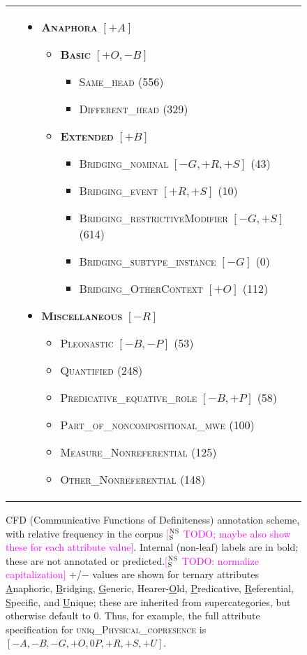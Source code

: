 \documentclass[11pt,letterpaper]{article}
\newcommand{\ensuretext}[1]{#1}
\newcommand{\nssmarker}{\ensuretext{\textcolor{magenta}{\ensuremath{^{\textsc{NS}}_{\textsc{S}}}}}}
\newcommand{\arkcomment}[3]{\ensuretext{\textcolor{#3}{[#1 #2]}}}
\newcommand{\nss}[1]{\arkcomment{\nssmarker}{#1}{magenta}}
\newcommand{\ilbl}[1]{\mbox{\textbf{\textsc{#1}}}} %
\newcommand{\llbl}[1]{\mbox{\textsc{#1}}} %
\newcommand{\costversion}[1]{}
\begin{document}
\begin{figure*}[t]
\begin{tabular}{p{}p{}}
\begin{itemize}
\end{itemize} &
\begin{itemize}
\item    \ilbl{Anaphora} $[+A]$
  \begin{itemize}
  \item      \ilbl{Basic} $[+O,-B]$
    \begin{itemize}
    \item        \llbl{Same\_head} {\tiny(556)}
    \item        \llbl{Different\_head} {\tiny(329)}
    \end{itemize}
  \item  \ilbl{Extended} $[+B]$
    \begin{itemize}
    \item        \llbl{Bridging\_nominal} $[-G,+R,+S]$ {\tiny(43)}
    \item        \llbl{Bridging\_event} $[+R,+S]$ {\tiny(10)}
    \item        \llbl{Bridging\_restrictiveModifier} $[-G,+S]$ {\tiny(614)}
    \item        \llbl{Bridging\_subtype\_instance} $[-G]$ {\tiny(0)}
    \item        \llbl{Bridging\_OtherContext} $[+O]$ {\tiny(112)}
    \end{itemize}
  \end{itemize}
\item \ilbl{Miscellaneous} $[-R]$
  \begin{itemize}
	\item \llbl{Pleonastic} $[-B,-P]$ {\tiny(53)}
	\item \llbl{Quantified} {\tiny(248)}
	\item \llbl{Predicative\_equative\_role} $[-B,+P]$ {\tiny(58)}
	\item \llbl{Part\_of\_noncompositional\_mwe} {\tiny(100)}
	\item \llbl{Measure\_Nonreferential} {\tiny(125)}
	\item \llbl{Other\_Nonreferential} {\tiny(148)}
  \end{itemize}
\end{itemize}
\end{tabular}
\caption{CFD (Communicative Functions of Definiteness) annotation scheme, with relative frequency in the corpus \nss{TODO; maybe also show these for each attribute value}. Internal (non-leaf) labels are in bold;\costversion{\nss{}} these are not annotated or predicted.\nss{TODO: normalize capitalization}
$+$/$-$ values are shown for ternary attributes \uline{A}naphoric, \uline{B}ridging, \uline{G}eneric, Hearer-\uline{O}ld, \uline{P}redicative, \uline{R}eferential, \uline{S}pecific, and \uline{U}nique; 
these are inherited from supercategories, but otherwise default to $0$.
Thus, for example, the full attribute specification for \llbl{uniq\_Physical\_copresence} is $[-A,-B,-G,+O,0P,+R,+S,+U]$.}
\label{fig:hierarchy}
\end{figure*}
\end{document}
